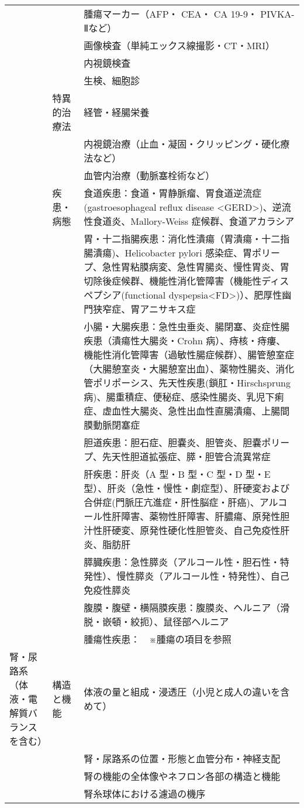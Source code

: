\documentclass[
]{ltjsarticle}
\begin{document}
\begin{xltabular}{\linewidth}{XXX}
 &  & 腫瘍マーカー（AFP・ CEA・ CA 19-9・ PIVKA-Ⅱなど） \\
 &  & 画像検査（単純エックス線撮影・CT・MRI） \\
 &  & 内視鏡検査 \\
 &  & 生検、細胞診 \\
 & 特異的治療法 & 経管・経腸栄養 \\
 &  & 内視鏡治療（止血・凝固・クリッピング・硬化療法など） \\
 &  & 血管内治療（動脈塞栓術など） \\
 & 疾患・病態 & 食道疾患：食道・胃静脈瘤、胃食道逆流症(gastroesophageal reflux disease <GERD>)、逆流性食道炎、Mallory-Weiss 症候群、食道アカラシア \\
 &  & 胃・十二指腸疾患：消化性潰瘍（胃潰瘍・十二指腸潰瘍)、Helicobacter pylori 感染症、胃ポリープ、急性胃粘膜病変、急性胃腸炎、慢性胃炎、胃切除後症候群、機能性消化管障害（機能性ディスペプシア(functional dyspepsia<FD>)）、肥厚性幽門狭窄症、胃アニサキス症 \\
 &  & 小腸・大腸疾患：急性虫垂炎、腸閉塞、炎症性腸疾患（潰瘍性大腸炎・Crohn 病）、痔核・痔瘻、機能性消化管障害（過敏性腸症候群）、腸管憩室症（大腸憩室炎・大腸憩室出血）、薬物性腸炎、消化管ポリポーシス、先天性疾患(鎖肛・Hirschsprung 病)、腸重積症、便秘症、感染性腸炎、乳児下痢症、虚血性大腸炎、急性出血性直腸潰瘍、上腸間膜動脈閉塞症 \\
 &  & 胆道疾患：胆石症、胆嚢炎、胆管炎、胆嚢ポリープ、先天性胆道拡張症、膵・胆管合流異常症 \\
 &  & 肝疾患：肝炎（A 型・B 型・C 型・D 型・E 型）、肝炎（急性・慢性・劇症型）、肝硬変および合併症(門脈圧亢進症・肝性脳症・肝癌)、アルコール性肝障害、薬物性肝障害、肝膿瘍、原発性胆汁性肝硬変、原発性硬化性胆管炎、自己免疫性肝炎、脂肪肝 \\
 &  & 膵臓疾患：急性膵炎（アルコール性・胆石性・特発性）、慢性膵炎（アルコール性・特発性）、自己免疫性膵炎 \\
 &  & 腹膜・腹壁・横隔膜疾患：腹膜炎、ヘルニア（滑脱・嵌頓・絞扼）、鼠径部ヘルニア \\
 &  & 腫瘍性疾患：　※腫瘍の項目を参照 \\
腎・尿路系（体液・電解質バランスを含む） & 構造と機能 & 体液の量と組成・浸透圧（小児と成人の違いを含めて） \\
 &  & 腎・尿路系の位置・形態と血管分布・神経支配 \\
 &  & 腎の機能の全体像やネフロン各部の構造と機能 \\
 &  & 腎糸球体における濾過の機序 \\

\end{xltabular}
\end{document}
